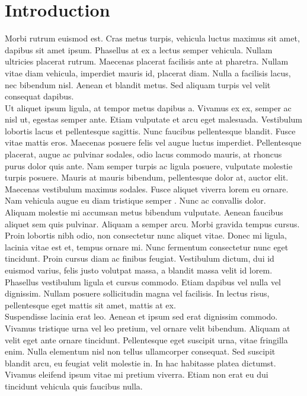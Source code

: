 \documentclass[12pt]{report}
\begin{document}
\chapter{Introduction}
\bigskip
{}%
Morbi rutrum euismod est. Cras metus turpis, vehicula luctus maximus sit amet, dapibus sit amet ipsum. Phasellus at ex a lectus semper vehicula. Nullam ultricies placerat rutrum. Maecenas placerat facilisis ante at pharetra. Nullam vitae diam vehicula, imperdiet mauris id, placerat diam. Nulla a facilisis lacus, nec bibendum nisl. Aenean et blandit metus. Sed aliquam turpis vel velit consequat dapibus.\\

\noindent Ut aliquet ipsum ligula, at tempor metus dapibus a. Vivamus ex ex, semper ac nisl ut, egestas semper ante. Etiam vulputate et arcu eget malesuada. Vestibulum lobortis lacus et pellentesque sagittis. Nunc faucibus pellentesque blandit. Fusce vitae mattis eros. Maecenas posuere felis vel augue luctus imperdiet. Pellentesque placerat, augue ac pulvinar sodales, odio lacus commodo mauris, at rhoncus purus dolor quis ante. Nam semper turpis ac ligula posuere, vulputate molestie turpis posuere. Mauris at mauris bibendum, pellentesque dolor at, auctor elit. Maecenas vestibulum maximus sodales. Fusce aliquet viverra lorem eu ornare. Nam vehicula augue eu diam tristique semper \cite{thantharate2019deepslice}. Nunc ac convallis dolor.\\

\noindent Aliquam molestie mi accumsan metus bibendum vulputate. Aenean faucibus aliquet sem quis pulvinar. Aliquam a semper arcu. Morbi gravida tempus cursus. Proin lobortis nibh odio, non consectetur nunc aliquet vitae. Donec mi ligula, lacinia vitae est et, tempus ornare mi. Nunc fermentum consectetur nunc eget tincidunt. Proin cursus diam ac finibus feugiat. Vestibulum dictum, dui id euismod varius, felis justo volutpat massa, a blandit massa velit id lorem. Phasellus vestibulum ligula et cursus commodo. Etiam dapibus vel nulla vel dignissim. Nullam posuere sollicitudin magna vel facilisis. In lectus risus, pellentesque eget mattis sit amet, mattis at ex.\\

\noindent Suspendisse lacinia erat leo. Aenean et ipsum sed erat dignissim commodo. Vivamus tristique urna vel leo pretium, vel ornare velit bibendum. Aliquam at velit eget ante ornare tincidunt. Pellentesque eget suscipit urna, vitae fringilla enim. Nulla elementum nisl non tellus ullamcorper consequat. Sed suscipit blandit arcu, eu feugiat velit molestie in. In hac habitasse platea dictumst. Vivamus eleifend ipsum vitae mi pretium viverra. Etiam non erat eu dui tincidunt vehicula quis faucibus nulla.\\
\end{document}

